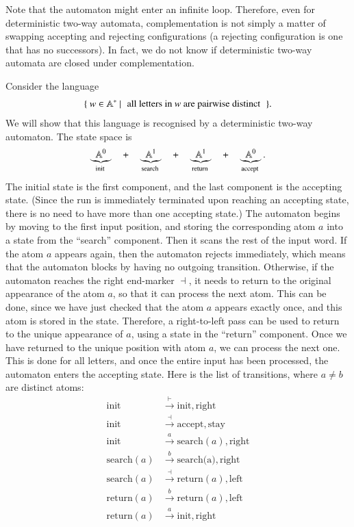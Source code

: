 Note that the automaton might enter an infinite loop. Therefore, even for deterministic two-way automata, complementation is not simply a matter of swapping accepting and rejecting configurations (a rejecting configuration is one that has no successors). In fact, we do not know if deterministic two-way automata are closed under complementation.

\begin{myexample}\label{ex:distinct-letters-two-way}
	Consider the language 
	\begin{align*}
	\setbuild{w \in \atoms^*}{all letters in $w$ are pairwise distinct}.
	\end{align*}
	We will show that this language is recognised by a deterministic two-way automaton. The state space is 
	\begin{align*}
	\myunderbrace{\atoms^0}{init} 
	\quad + \quad
	\myunderbrace{\atoms^1}{search}
	\quad + \quad
	\myunderbrace{\atoms^1}{return}
	\quad + \quad 
	\myunderbrace{\atoms^0}{accept}.
	\end{align*}
	The initial state is the first component, and the last component is the accepting state. (Since the run is immediately terminated upon reaching an accepting state, there is no need to have more than one accepting state.) The automaton begins by moving to the first input position, and storing the corresponding atom $a$ into a state from the ``search'' component. Then it scans the rest of the input word. If the atom $a$ appears again, then the automaton rejects immediately, which means that the automaton blocks by having no outgoing transition. Otherwise, if the automaton reaches the right end-marker $\dashv$, it needs to return to the original appearance of the atom $a$, so that it can process the next atom. This can be done, since we have just checked that the atom $a$ appears exactly once, and this atom is stored in the state. Therefore, a right-to-left pass can be used to return to the unique appearance of $a$, using a state in the ``return'' component. Once we have returned to the unique position with atom $a$, we can process the next one. This is done for all letters, and once the entire input has been processed, the automaton enters the accepting state. Here is the list of transitions, where $a \neq b$ are distinct atoms: 
	\begin{align*}
	\text{init} & \stackrel {\vdash} \to \text{init}, \text{right}\\
	\text{init} & \stackrel {\dashv} \to \text{accept}, \text{stay}\\
	\text{init} & \stackrel a \to \text{search}(a), \text{right} \\
	\text{search}(a) & \stackrel b \to \text{search(a)}, \text{right} \\
	\text{search}(a) & \stackrel {\dashv} \to \text{return}(a), \text{left} \\
	\text{return}(a) & \stackrel b \to \text{return}(a), \text{left} \\
	\text{return}(a) & \stackrel a \to \text{init}, \text{right} 
	\end{align*}
\end{myexample}

